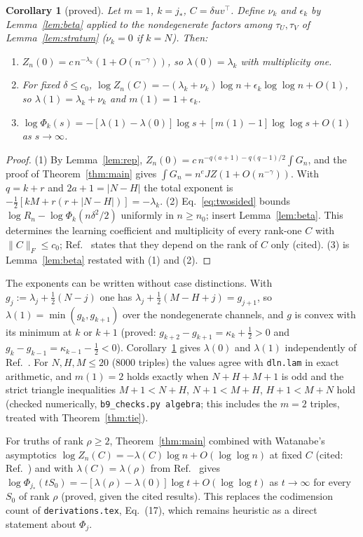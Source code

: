 \documentclass[11pt]{article}
\newtheorem{corollary}[theorem]{Corollary}
\theoremstyle{remark}
\begin{document}
\begin{corollary}[proved]\label{cor:exponents}
Let $m=1$, $k=j_*$, $C=\delta uv^\top$.
Define $\nu_k$ and $\epsilon_k$ by Lemma~\ref{lem:beta} applied to the nondegenerate factors among $\tau_U,\tau_V$ of Lemma~\ref{lem:stratum} ($\nu_k=0$ if $k=N$).
Then:
\begin{enumerate}
\item $Z_n(0)=c\,n^{-\lambda_k}(1+O(n^{-\gamma}))$, so $\lambda(0)=\lambda_k$ with multiplicity one.
\item For fixed $\delta\le c_0$, $\log Z_n(C)=-(\lambda_k+\nu_k)\log n+\epsilon_k\log\log n+O(1)$, so $\lambda(1)=\lambda_k+\nu_k$ and $m(1)=1+\epsilon_k$.
\item $\log\Phi_k(s)=-[\lambda(1)-\lambda(0)]\log s+[m(1)-1]\log\log s+O(1)$ as $s\to\infty$.
\end{enumerate}
\end{corollary}

\begin{proof}
(1) By Lemma~\ref{lem:rep}, $Z_n(0)=c\,n^{-q(a+1)-q(q-1)/2}\int G_n$, and the proof of Theorem~\ref{thm:main} gives $\int G_n=n^eJZ(1+O(n^{-\gamma}))$.
With $q=k+r$ and $2a+1=\lvert N-H\rvert$ the total exponent is $-\tfrac12[kM+r(r+\lvert N-H\rvert)]=-\lambda_k$.
(2) Eq.~\eqref{eq:twosided} bounds $\log R_n-\log\Phi_k(n\delta^2/2)$ uniformly in $n\ge n_0$; insert Lemma~\ref{lem:beta}.
This determines the learning coefficient and multiplicity of every rank-one $C$ with $\lVert C\rVert_F\le c_0$; Ref.~\cite{AW05} states that they depend on the rank of $C$ only (cited).
(3) is Lemma~\ref{lem:beta} restated with (1) and (2).
\end{proof}

The exponents can be written without case distinctions.
With $g_j:=\lambda_j+\tfrac12(N-j)$ one has $\lambda_j+\tfrac12(M-H+j)=g_{j+1}$, so $\lambda(1)=\min(g_k,g_{k+1})$ over the nondegenerate channels, and $g$ is convex with its minimum at $k$ or $k+1$ (proved: $g_{k+2}-g_{k+1}=\kappa_k+\tfrac12>0$ and $g_k-g_{k-1}=\kappa_{k-1}-\tfrac12<0$).
Corollary~\ref{cor:exponents} gives $\lambda(0)$ and $\lambda(1)$ independently of Ref.~\cite{AW05}.
For $N,H,M\le20$ ($8000$ triples) the values agree with \texttt{dln.lam} in exact arithmetic, and $m(1)=2$ holds exactly when $N+H+M+1$ is odd and the strict triangle inequalities $M+1<N+H$, $N+1<M+H$, $H+1<M+N$ hold (checked numerically, \texttt{b9\_checks.py algebra}; this includes the $m=2$ triples, treated with Theorem~\ref{thm:tie}).

For truths of rank $\rho\ge2$, Theorem~\ref{thm:main} combined with Watanabe's asymptotics $\log Z_n(C)=-\lambda(C)\log n+O(\log\log n)$ at fixed $C$ (cited: Ref.~\cite{Wat09}) and with $\lambda(C)=\lambda(\rho)$ from Ref.~\cite{AW05} gives $\log\Phi_{j_*}(tS_0)=-[\lambda(\rho)-\lambda(0)]\log t+O(\log\log t)$ as $t\to\infty$ for every $S_0$ of rank $\rho$ (proved, given the cited results).
This replaces the codimension count of \texttt{derivations.tex}, Eq.~(17), which remains heuristic as a direct statement about $\Phi_{j}$.
\end{document}
